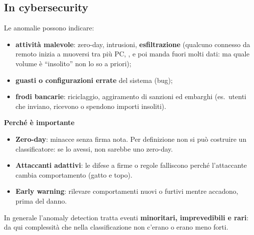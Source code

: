 \subsection{In cybersecurity}
Le anomalie possono indicare:
\begin{itemize}
  \item \textbf{attività malevole}: zero-day, intrusioni, \textbf{esfiltrazione} (qualcuno connesso da remoto inizia a muoversi tra più PC,
        , e poi manda fuori molti dati: ma quale volume è ``insolito'' non lo so a priori);
  \item \textbf{guasti o configurazioni errate} del sistema (bug);
  \item \textbf{frodi bancarie}: riciclaggio, aggiramento di sanzioni ed embarghi (es.\ utenti che inviano, ricevono o spendono importi insoliti).
\end{itemize}
\textbf{Perché è importante}
\begin{itemize}
  \item \textbf{Zero-day}: minacce senza firma nota. Per definizione non si può costruire un classificatore: se lo avessi, non sarebbe uno zero-day.
  \item \textbf{Attaccanti adattivi}: le difese a firme o regole falliscono perché l'attaccante cambia comportamento (gatto e topo).
  \item \textbf{Early warning}: rilevare comportamenti nuovi o furtivi mentre accadono, prima del danno.
\end{itemize}
In generale l'anomaly detection tratta eventi \textbf{minoritari, imprevedibili e rari}: da qui complessità che nella classificazione non
c'erano o erano meno forti.

